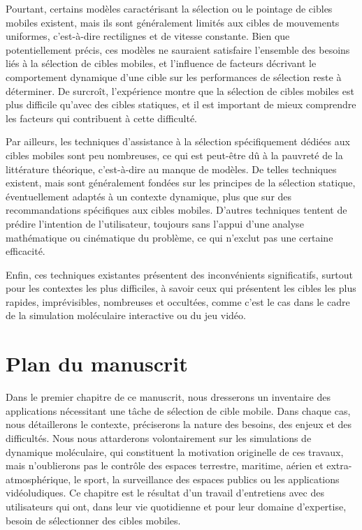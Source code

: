 	Pourtant, certains modèles caractérisant la sélection ou le pointage de cibles mobiles existent, mais ils sont généralement limités aux cibles de mouvements uniformes, c'est-à-dire rectilignes et de vitesse constante. Bien que potentiellement précis, ces modèles ne sauraient satisfaire l'ensemble des besoins liés à la sélection de cibles mobiles, et l'influence de facteurs décrivant le comportement dynamique d'une cible sur les performances de sélection reste à déterminer. De surcroît, l'expérience montre que la sélection de cibles mobiles est plus difficile qu'avec des cibles statiques, et il est important de mieux comprendre les facteurs qui contribuent à cette difficulté.
	
	Par ailleurs, les techniques d'assistance à la sélection spécifiquement dédiées aux cibles mobiles sont peu nombreuses, ce qui est peut-être dû à la pauvreté de la littérature théorique, c'est-à-dire au manque de modèles. De telles techniques existent, mais sont généralement fondées sur les principes de la sélection statique, éventuellement adaptés à un contexte dynamique, plus que sur des recommandations spécifiques aux cibles mobiles. D'autres techniques tentent de prédire l'intention de l'utilisateur, toujours sans l'appui d'une analyse mathématique ou cinématique du problème, ce qui n'exclut pas une certaine efficacité.
	
	Enfin, ces techniques existantes présentent des inconvénients significatifs, surtout pour les contextes les plus difficiles, à savoir ceux qui présentent les cibles les plus rapides, imprévisibles, nombreuses et occultées, comme c'est le cas dans le cadre de la simulation moléculaire interactive ou du jeu vidéo.

\section*{Plan du manuscrit}
	Dans le premier chapitre de ce manuscrit, nous dresserons un inventaire des applications nécessitant une tâche de sélection de cible mobile. Dans chaque cas, nous détaillerons le contexte, préciserons la nature des besoins, des enjeux et des difficultés. Nous nous attarderons volontairement sur les simulations de dynamique moléculaire, qui constituent la motivation originelle de ces travaux, mais n'oublierons pas le contrôle des espaces terrestre, maritime, aérien et extra-atmosphérique, le sport, la surveillance des espaces publics ou les applications vidéoludiques. Ce chapitre est le résultat d'un travail d'entretiens avec des utilisateurs qui ont, dans leur vie quotidienne et pour leur domaine d'expertise, besoin de sélectionner des cibles mobiles.
	
